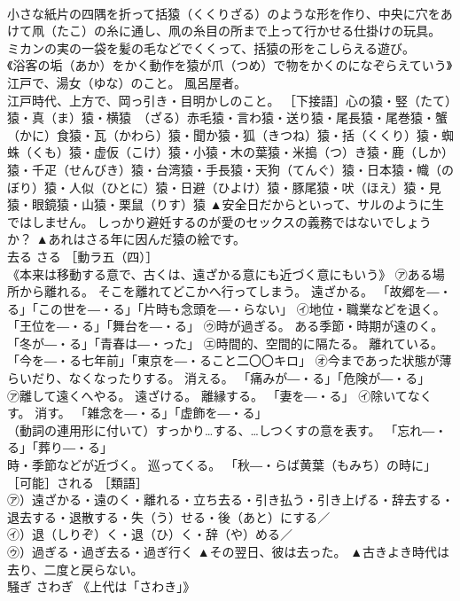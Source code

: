 \documentclass[8pt]{extreport}
\begin{document}
\begin{CJK}{UTF8}{min}
\\	小さな紙片の四隅を折って括猿（くくりざる）のような形を作り、中央に穴をあけて凧（たこ）の糸に通し、凧の糸目の所まで上って行かせる仕掛けの玩具。 
\\	ミカンの実の一袋を髪の毛などでくくって、括猿の形をこしらえる遊び。 
\\	《浴客の垢（あか）をかく動作を猿が爪（つめ）で物をかくのになぞらえていう》江戸で、湯女（ゆな）のこと。 風呂屋者。 
\\	江戸時代、上方で、岡っ引き・目明かしのこと。 ［下接語］心の猿・竪（たて）猿・真（ま）猿・横猿　（ざる）赤毛猿・言わ猿・送り猿・尾長猿・尾巻猿・蟹（かに）食猿・瓦（かわら）猿・聞か猿・狐（きつね）猿・括（くくり）猿・蜘蛛（くも）猿・虚仮（こけ）猿・小猿・木の葉猿・米搗（つ）き猿・鹿（しか）猿・千疋（せんびき）猿・台湾猿・手長猿・天狗（てんぐ）猿・日本猿・幟（のぼり）猿・人似（ひとに）猿・日避（ひよけ）猿・豚尾猿・吠（ほえ）猿・見猿・眼鏡猿・山猿・栗鼠（りす）猿	▲安全日だからといって、サルのように生ではしません。 しっかり避妊するのが愛のセックスの義務ではないでしょうか？ ▲あれはさる年に因んだ猿の絵です。
\\	去る	さる	［動ラ五（四）］ 
\\	《本来は移動する意で、古くは、遠ざかる意にも近づく意にもいう》 ㋐ある場所から離れる。 そこを離れてどこかへ行ってしまう。 遠ざかる。 「故郷を―・る」「この世を―・る」「片時も念頭を―・らない」 ㋑地位・職業などを退く。 「王位を―・る」「舞台を―・る」 ㋒時が過ぎる。 ある季節・時期が遠のく。 「冬が―・る」「青春は―・った」 ㋓時間的、空間的に隔たる。 離れている。 「今を―・る七年前」「東京を―・ること二〇〇キロ」 ㋔今まであった状態が薄らいだり、なくなったりする。 消える。 「痛みが―・る」「危険が―・る」 
\\	㋐離して遠くへやる。 遠ざける。 離縁する。 「妻を―・る」 ㋑除いてなくす。 消す。 「雑念を―・る」「虚飾を―・る」 
\\	（動詞の連用形に付いて）すっかり…する、…しつくすの意を表す。 「忘れ―・る」「葬り―・る」 
\\	時・季節などが近づく。 巡ってくる。 「秋―・らば黄葉（もみち）の時に」 ［可能］される ［類語］
\\	㋐）遠ざかる・遠のく・離れる・立ち去る・引き払う・引き上げる・辞去する・退去する・退散する・失（う）せる・後（あと）にする／
\\	㋑）退（しりぞ）く・退（ひ）く・辞（や）める／
\\	㋒）過ぎる・過ぎ去る・過ぎ行く	▲その翌日、彼は去った。 ▲古きよき時代は去り、二度と戻らない。
\\	騒ぎ	さわぎ	《上代は「さわき」》 

\end{CJK}
\end{document}
